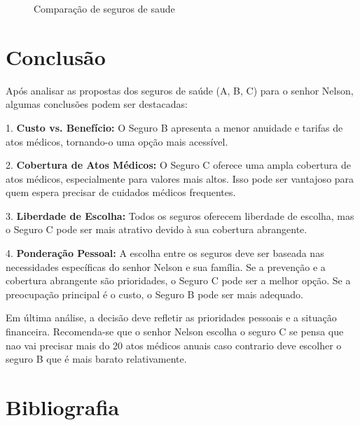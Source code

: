 \documentclass[10pt,a4paper]{article}
\begin{document}
\begin{figure}[!ht]
	\caption{Comparação de seguros de saude}
\end{figure}

\newpage
\section{Conclusão}

Após analisar as propostas dos seguros de saúde (A, B, C) para o senhor Nelson, algumas conclusões podem ser destacadas:

1. \textbf{Custo vs. Benefício:} O Seguro B apresenta a menor anuidade e tarifas de atos médicos, tornando-o uma opção mais acessível.

2. \textbf{Cobertura de Atos Médicos:} O Seguro C oferece uma ampla cobertura de atos médicos, especialmente para valores mais altos. Isso pode ser vantajoso para quem espera precisar de cuidados médicos frequentes.

3. \textbf{Liberdade de Escolha:} Todos os seguros oferecem liberdade de escolha, mas o Seguro C pode ser mais atrativo devido à sua cobertura abrangente.

4. \textbf{Ponderação Pessoal:} A escolha entre os seguros deve ser baseada nas necessidades específicas do senhor Nelson e sua família. Se a prevenção e a cobertura abrangente são prioridades, o Seguro C pode ser a melhor opção. Se a preocupação principal é o custo, o Seguro B pode ser mais adequado.

Em última análise, a decisão deve refletir as prioridades pessoais e a situação financeira. Recomenda-se que o senhor Nelson escolha o seguro C se pensa que nao vai precisar mais do 20 atos médicos anuais caso contrario deve escolher o seguro B que é mais barato relativamente.

\section{Bibliografia}


\printindex
\end{document}
